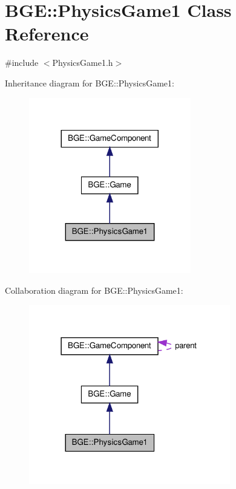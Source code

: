 \hypertarget{class_b_g_e_1_1_physics_game1}{\section{B\-G\-E\-:\-:Physics\-Game1 Class Reference}
\label{class_b_g_e_1_1_physics_game1}
}


{\ttfamily \#include $<$Physics\-Game1.\-h$>$}



Inheritance diagram for B\-G\-E\-:\-:Physics\-Game1\-:
\nopagebreak
\begin{figure}[H]
\begin{center}
\leavevmode
\includegraphics[width=200pt]{class_b_g_e_1_1_physics_game1__inherit__graph}
\end{center}
\end{figure}


Collaboration diagram for B\-G\-E\-:\-:Physics\-Game1\-:
\nopagebreak
\begin{figure}[H]
\begin{center}
\leavevmode
\includegraphics[width=249pt]{class_b_g_e_1_1_physics_game1__coll__graph}
\end{center}
\end{figure}

